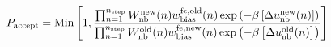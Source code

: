 \documentclass[12pt]{article}
\begin{document}
\begin{displaymath}
P_{\rm accept} = {\rm Min}\left[1,
{
{\prod_{n=1}^{n_{\rm step}} 
W_{\rm nb}^{\rm new}(n)
w_{\rm bias}^{\rm fe, old}(n)
\exp\left(-\beta\left[\Delta u_{\rm nb}^{\rm new}(n)\right]\right)
}
\over
{\prod_{n=1}^{n_{\rm step}}
W_{\rm nb}^{\rm old}(n)
w_{\rm bias}^{\rm fe, new}(n)
\exp\left(-\beta\left[\Delta u_{\rm nb}^{\rm old}(n)\right]\right)
}
}
\right]
\end{displaymath}
\end{document}
